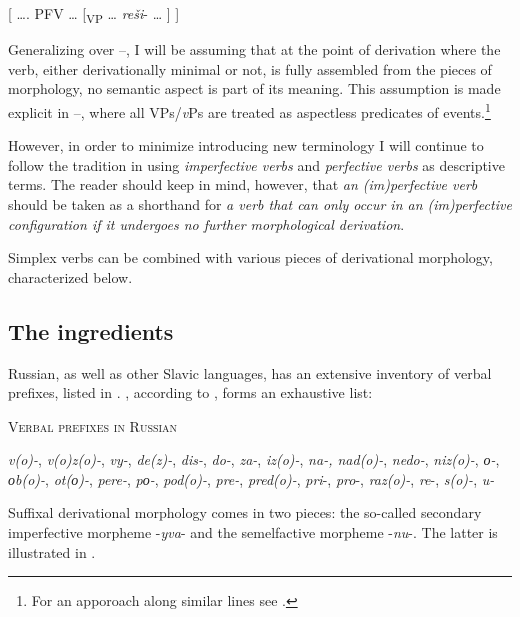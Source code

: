 \documentclass[output=paper,colorlinks,citecolor=brown]{langscibook}
\begin{document}
\ex{} [  …. PFV …   [\textsubscript{VP} … \textit{reši}- … ] ]\label{ex:tatevosov:7b}
\z
\z

\noindent Generalizing over --, I will be assuming that at the point of derivation where the verb, either derivationally minimal or not, is fully assembled from the pieces of morphology, no semantic aspect is part of its meaning. This assumption is made explicit in --, where all VPs/\textit{v}Ps are treated as aspectless predicates of events.\footnote{For an apporoach along similar lines see .}

However, in order to minimize introducing new terminology I will continue to follow the tradition in using \textit{imperfective verbs} and \textit{perfective verbs} as descriptive terms. The reader should keep in mind, however, that \textit{an (im)perfective verb} should be taken as a shorthand for \textit{a verb that can only occur in an (im)per\-fec\-tive configuration if it undergoes no further morphological derivation}. 

Simplex verbs can be combined with various pieces of derivational morphology, characterized below.

\subsection{The ingredients}\label{sec:1.2}
\hypertarget{RefHeadingToc164647618}{}
Russian, as well as other Slavic languages, has an extensive inventory of verbal prefixes, listed in . , according to \citet[][\S 850]{Svedova1980}, forms an exhaustive list:

\ea   \textsc{Verbal prefixes in Russian}\label{ex:tatevosov:8}

  \textit{v(o)-}, \textit{v(o)z(o)-}, \textit{vy-}, \textit{de(z)-}, \textit{dis-}, \textit{do-}, \textit{za-}, \textit{iz(o)-}, \textit{na-, nad(o)-}, \textit{nedo-}, \textit{niz(o)-}, \textit{{о}-}, \textit{{о}b(o)-}, \textit{ot({о})-}, \textit{pere-}, \textit{p{о}-}, \textit{pod(o)-}, \textit{pre-}, \textit{pred(o)-}, \textit{pri}-, \textit{pro}-, \textit{raz(o)-}, \textit{re}-, \textit{s(o)-}, \textit{u-}
\z

\noindent Suffixal derivational morphology comes in two pieces: the so-called secondary imperfective morpheme -\textit{yva}- and the semelfactive morpheme -\textit{nu}-. The latter is illustrated in . 
\end{document}
